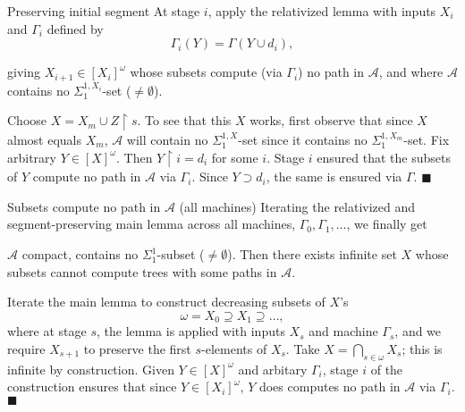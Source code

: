 \begin{frame}{Preserving initial segment}
  At stage $i$, apply the relativized lemma with inputs $X_i$ and
  $\Gamma_i$ defined by
  \[\Gamma_i(Y) =\Gamma(Y\cup d_i),\]

  giving $X_{i+1}\in[X_i]^\omega$ whose subsets compute (via
  $\Gamma_i$) no path in $\mathcal{A}$, and where $\mathcal{A}$ contains no
  $\Sigma_1^{1,X_i}$-set ($\neq\emptyset$).

  \vspace{0.5em}
  Choose $X=X_m\cup Z\restriction s$. To see that this $X$ works, first
  observe that since $X$ almost equals $X_m$, $\mathcal{A}$ will
  contain no $\Sigma_1^{1,X}$-set since it contains no
  $\Sigma_1^{1,X_m}$-set. Fix arbitrary $Y\in[X]^\omega$. Then
  $Y\restriction i=d_i$ for some $i$. Stage $i$ ensured that the subsets of
  $Y$ compute no path in $\mathcal{A}$ via $\Gamma_i$. Since $Y\supset
  d_i$, the same is ensured via $\Gamma$. $\blacksquare$
\end{frame}

\begin{frame}{Subsets compute no path in $\mathcal{A}$ (all machines)}
  Iterating the relativized and segment-preserving main lemma across all
  machines, $\Gamma_0,\Gamma_1,\ldots$, we finally get
  \begin{main-thm*}
    $\mathcal{A}$ compact, contains no $\Sigma_1^1$-subset
    ($\neq\emptyset$). Then there exists infinite set $X$ whose subsets
    cannot compute trees with some paths in $\mathcal{A}$.
  \end{main-thm*}

  Iterate the main lemma to construct decreasing subsets of $X$'s
  \[\omega= X_0\supseteq X_1\supseteq\ldots,\]
  where at stage $s$, the lemma is applied with inputs $X_s$ and machine
  $\Gamma_s$, and we require $X_{s+1}$ to preserve the first $s$-elements
  of $X_s$. Take $X=\bigcap_{s\in\omega}X_s$; this is infinite by
  construction. Given $Y\in[X]^\omega$ and arbitary $\Gamma_i$, stage $i$
  of the construction ensures that since $Y\in[X_i]^\omega$, $Y$ does
  computes no path in $\mathcal{A}$ via $\Gamma_i$. $\blacksquare$
\end{frame}

